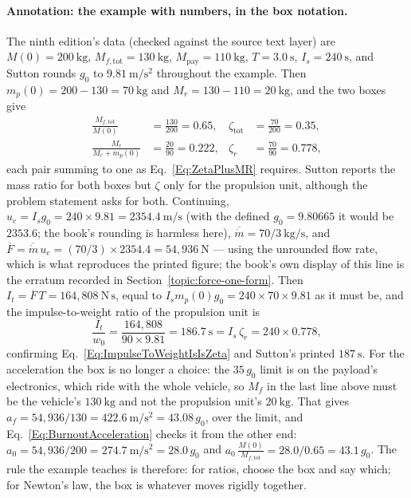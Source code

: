 \paragraph*{Annotation: the example with numbers, in the box notation.}
The ninth edition's data (checked against the source text layer) are
$M(0)=200\ \mathrm{kg}$, $M_{f,\text{tot}}=130\ \mathrm{kg}$,
$M_{\text{pay}}=110\ \mathrm{kg}$, $T=3.0\ \mathrm{s}$, $I_s=240\ \mathrm{s}$,
and Sutton rounds $g_0$ to $9.81\ \mathrm{m/s^2}$ throughout the example.
Then $m_p(0)=200-130=70\ \mathrm{kg}$ and $M_r=130-110=20\ \mathrm{kg}$, and
the two boxes give
\[
\begin{aligned}
 \frac{M_{f,\text{tot}}}{M(0)}&=\frac{130}{200}=0.65, &
 \zeta_{\text{tot}}&=\frac{70}{200}=0.35, \\
 \frac{M_r}{M_r+m_p(0)}&=\frac{20}{90}=0.222, &
 \zeta_r&=\frac{70}{90}=0.778,
\end{aligned}
\]
each pair summing to one as Eq.~\ref{Eq:ZetaPlusMR} requires. Sutton
reports the mass ratio for both boxes but $\zeta$ only for the propulsion
unit, although the problem statement asks for both. Continuing,
$u_e=I_sg_0=240\times9.81=2354.4\ \mathrm{m/s}$
(with the defined $g_0=9.80665$ it would be $2353.6$; the book's rounding is
harmless here), $\overline{\dot m}=70/3\ \mathrm{kg/s}$, and
$\overline F=\overline{\dot m}\,u_e=(70/3)\times2354.4=54{,}936\ \mathrm{N}$
--- using the unrounded flow rate, which is what reproduces the printed
figure; the book's own display of this line is the erratum recorded in
Section~\ref{topic:force-one-form}. Then $I_t=\overline F\,T=164{,}808\
\mathrm{N\,s}$, equal to $I_sm_p(0)g_0=240\times70\times9.81$ as it must be,
and the impulse-to-weight ratio of the propulsion unit is
\[
 \frac{I_t}{w_0}=\frac{164{,}808}{90\times9.81}=186.7\ \mathrm{s}
 =I_s\,\zeta_r=240\times0.778 ,
\]
confirming Eq.~\ref{Eq:ImpulseToWeightIsIsZeta} and Sutton's printed
$187\ \mathrm{s}$. For the acceleration the box is no longer a choice: the
$35\,g_0$ limit is on the payload's electronics, which ride with the whole
vehicle, so $M_f$ in the last line above must be the vehicle's
$130\ \mathrm{kg}$ and not the propulsion unit's $20\ \mathrm{kg}$. That gives
$a_f=54{,}936/130=422.6\ \mathrm{m/s^2}=43.08\,g_0$, over the limit, and
Eq.~\ref{Eq:BurnoutAcceleration} checks it from the other end:
$a_0=54{,}936/200=274.7\ \mathrm{m/s^2}=28.0\,g_0$ and
$a_0\,\frac{M(0)}{M_{f,\text{tot}}}=28.0/0.65=43.1\,g_0$. The rule the example
teaches is therefore: for ratios, choose the box and say which; for
Newton's law, the box is whatever moves rigidly together.


